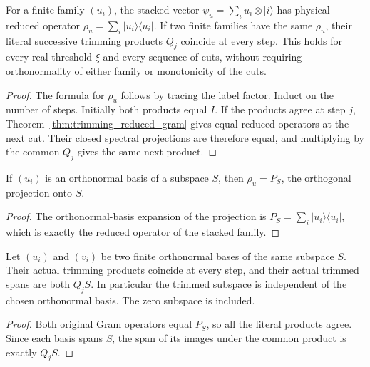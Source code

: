 \begin{theorem}
    \label{thm:trimming_gram_invariance}
    \leanok
    For a finite family $(u_i)$, the stacked vector
    $\psi_u=\sum_i u_i\otimes|i\rangle$ has physical reduced operator
    $\rho_u=\sum_i|u_i\rangle\langle u_i|$.
    If two finite families have the same $\rho_u$, their literal successive
    trimming products $Q_j$ coincide at every step. This holds for every
    real threshold $\xi$ and every sequence of cuts, without requiring
    orthonormality of either family or monotonicity of the cuts.
\end{theorem}
\begin{proof}\leanok
    The formula for $\rho_u$ follows by tracing the label factor.
    Induct on the number of steps. Initially both products equal $I$.
    If the products agree at step $j$, Theorem~\ref{thm:trimming_reduced_gram} gives equal
    reduced operators at the next cut. Their closed spectral projections
    are therefore equal, and multiplying by the common $Q_j$ gives the
    same next product.
\end{proof}

\begin{theorem}
    \label{thm:trimming_basis_gram}
    \leanok
    If $(u_i)$ is an orthonormal basis of a subspace $S$, then
    $\rho_u=P_S$, the orthogonal projection onto $S$.
\end{theorem}
\begin{proof}\leanok
    The orthonormal-basis expansion of the projection is
    $P_S=\sum_i|u_i\rangle\langle u_i|$, which is exactly the reduced
    operator of the stacked family.
\end{proof}

\begin{theorem}
    \label{thm:trimming_basis_invariance}
    \leanok
    Let $(u_i)$ and $(v_i)$ be two finite orthonormal bases of the same
    subspace $S$. Their actual trimming products coincide at every step,
    and their actual trimmed spans are both $Q_jS$. In particular the
    trimmed subspace is independent of the chosen orthonormal basis.
    The zero subspace is included.
\end{theorem}
\begin{proof}\leanok
    Both original Gram operators equal $P_S$, so all the literal products
    agree. Since each basis spans $S$, the span of its images under the
    common product is exactly $Q_jS$.
\end{proof}
